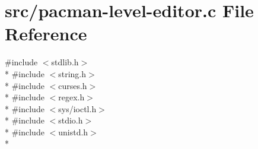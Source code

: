 \hypertarget{pacman-level-editor_8c}{\section{src/pacman-\/level-\/editor.c File Reference}
\label{pacman-level-editor_8c}
}
{\ttfamily \#include $<$stdlib.\-h$>$}\\*
{\ttfamily \#include $<$string.\-h$>$}\\*
{\ttfamily \#include $<$curses.\-h$>$}\\*
{\ttfamily \#include $<$regex.\-h$>$}\\*
{\ttfamily \#include $<$sys/ioctl.\-h$>$}\\*
{\ttfamily \#include $<$stdio.\-h$>$}\\*
{\ttfamily \#include $<$unistd.\-h$>$}\\*
